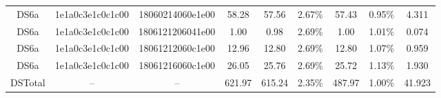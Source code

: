 \begin{tabular}{|c|c c|c|c c|c c|c|}
  DS6a & 1e1a0c3e1c0c1c00 & 18060214060e1e00 & 58.28 & 57.56 & 2.67\% & 57.43 & 0.95\% & 4.311 \\
  DS6a & 1e1a0c3e1c0c1c00 & 1806121206041e00 & 1.00 & 0.98 & 2.69\% & 1.00 & 1.01\% & 0.074 \\
  DS6a & 1e1a0c3e1c0c1c00 & 18061212060c1e00 & 12.96 & 12.80 & 2.69\% & 12.80 & 1.07\% & 0.959 \\
  DS6a & 1e1a0c3e1c0c1c00 & 18061216060c1e00 & 26.05 & 25.76 & 2.69\% & 25.72 & 1.13\% & 1.930 \\
  \hline
  DSTotal & -- & -- & 621.97 & 615.24 & 2.35\% & 487.97 & 1.00\% & 41.923 \\
  \hline
\end{tabular}